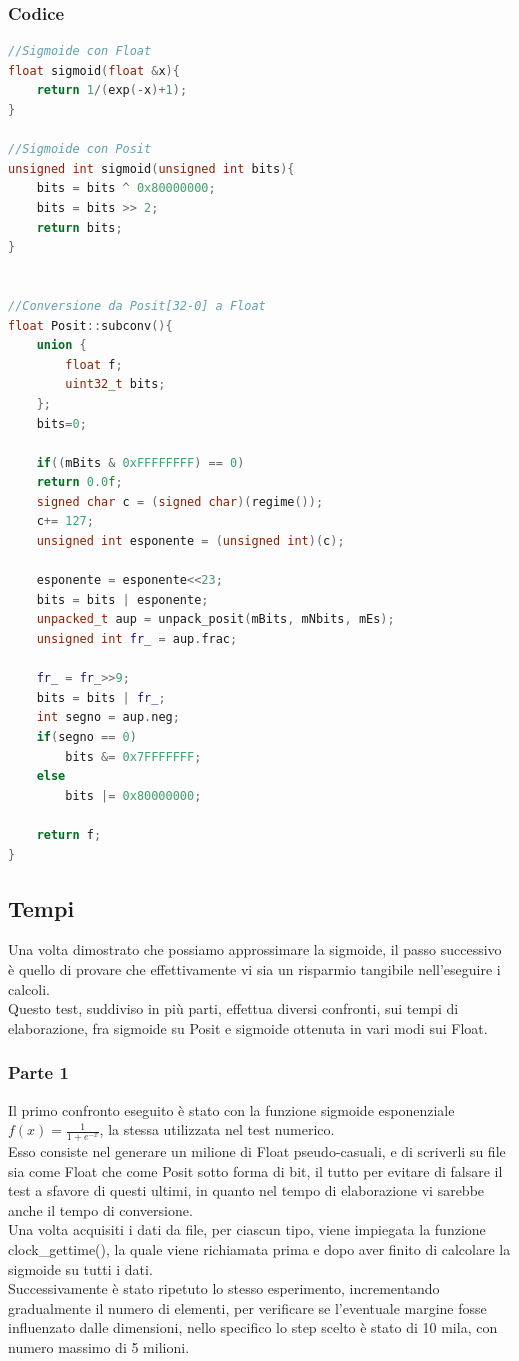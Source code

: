 \documentclass[a4paper,11pt]{article}
\begin{document}
\subsubsection{Codice}

\begin{lstlisting}[language=C++]
//Sigmoide con Float
float sigmoid(float &x){
	return 1/(exp(-x)+1);
}

//Sigmoide con Posit
unsigned int sigmoid(unsigned int bits){
	bits = bits ^ 0x80000000;
	bits = bits >> 2;
	return bits;
}


//Conversione da Posit[32-0] a Float
float Posit::subconv(){
	union {
		float f;
		uint32_t bits;
	};
	bits=0;
	
	if((mBits & 0xFFFFFFFF) == 0)
	return 0.0f;
	signed char c = (signed char)(regime());
	c+= 127;
	unsigned int esponente = (unsigned int)(c);	
	
	esponente = esponente<<23;
	bits = bits | esponente;
	unpacked_t aup = unpack_posit(mBits, mNbits, mEs);
	unsigned int fr_ = aup.frac;
	
	fr_ = fr_>>9;
	bits = bits | fr_;
	int segno = aup.neg;
	if(segno == 0)
		bits &= 0x7FFFFFFF;
	else
		bits |= 0x80000000;
	
	return f;
}
\end{lstlisting}
\newpage
\subsection{Tempi}

Una volta dimostrato che possiamo approssimare la sigmoide, il passo successivo è quello di provare che effettivamente vi sia un risparmio tangibile nell'eseguire i calcoli. \\
Questo test, suddiviso in più parti, effettua diversi confronti, sui tempi di elaborazione, fra sigmoide su Posit e sigmoide ottenuta in vari modi sui Float.

\subsubsection{Parte 1}

Il primo confronto eseguito è stato con la funzione sigmoide esponenziale  $ f(x) = \frac {1}{1 + e^{-x}} $, la stessa utilizzata nel test numerico.\\
Esso consiste nel generare un milione di Float pseudo-casuali, e di scriverli su file sia come Float che come Posit sotto forma di bit, il tutto per evitare di falsare il test a sfavore di questi ultimi, in quanto nel tempo di elaborazione vi sarebbe anche il tempo di conversione. \\
Una volta acquisiti i dati da file, per ciascun tipo, viene impiegata la funzione clock\_gettime(), la quale viene richiamata prima e dopo aver finito di calcolare la sigmoide su tutti i dati.\\
Successivamente è stato ripetuto lo stesso esperimento, incrementando gradualmente il numero di elementi, per verificare se l'eventuale margine fosse influenzato dalle dimensioni, nello specifico lo step scelto è stato di 10 mila, con numero massimo di 5 milioni.
\end{document}
